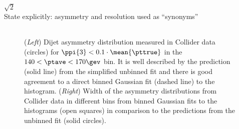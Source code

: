 $\sqrt{2}$\\
State explicitly: asymmetry and resolution used as ``synonyms''


\begin{figure}[ht]
  \centering
  \begin{tabular}{cc}
\end{tabular}
  \caption{(\textit{Left}) Dijet asymmetry distribution measured in
    Collider data (circles) for \mbox{$\ppi{3}  < 
      0.1\cdot\mean{\pttrue}$} in the \mbox{$140 < \ptave < 170\gev$} bin.
    It is well described by the prediction (solid line) from the
    simplified unbinned fit and there is good agreement to a direct binned
    Gaussian fit (dashed line) to the histogram.
    (\textit{Right}) Width of the asymmetry distributions from
    Collider data in different \ptave bins from binned Gaussian fits to the
    histograms (open squares) in comparison to the predictions from
    the unbinned fit (solid circles).}
  \label{fig:qcd:resolMaxlike:asymmetry}
\end{figure}



